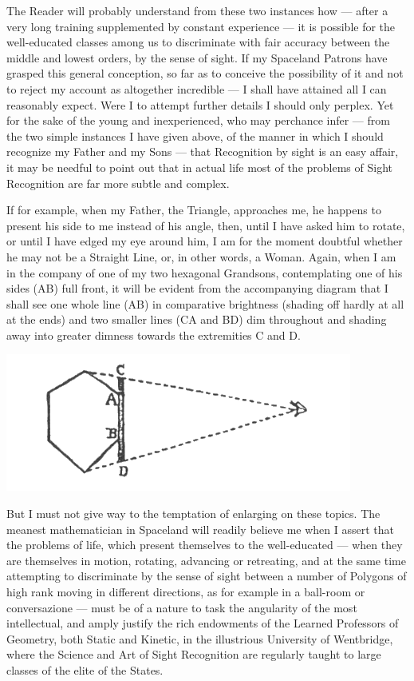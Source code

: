 \documentclass[12pt, a4paper, twoside]{memoir}
\begin{document}
The Reader will probably understand from these
two instances how --- after a very long training supplemented by constant
experience --- it is possible for the well-educated classes among us to
discriminate with fair accuracy between the middle and lowest orders, by the
sense of sight. If my Spaceland Patrons have grasped this general conception,
so far as to conceive the possibility of it and not to reject my account as
altogether incredible --- I shall have attained all I can reasonably expect.
Were I to attempt further details I should only perplex. Yet for the sake of
the young and inexperienced, who may perchance infer --- from the two simple
instances I have given above, of the manner in which I should recognize my
Father and my Sons --- that Recognition by sight is an easy affair, it may be
needful to point out that in actual life most of the problems of Sight
Recognition are far more subtle and complex.

If for example, when my Father, the Triangle, approaches me, he happens to
present his side to me instead of his angle, then, until I have asked him to
rotate, or until I have edged my eye around him, I am for the moment doubtful
whether he may not be a Straight Line, or, in other words, a Woman. Again,
when I am in the company of one of my two hexagonal Grandsons, contemplating
one of his sides (AB) full front, it will be evident from the accompanying
diagram that I shall see one whole line (AB) in comparative brightness
(shading off hardly at all at the ends) and two smaller lines (CA and BD) dim
throughout and shading away into greater dimness towards the extremities C and
D. 
\begin{center}
\includegraphics[trim=20mm 0mm 0mm 0mm, scale=0.5]{fig4}
\end{center}


But I must not give way to the temptation of enlarging on these
topics. The meanest mathematician in Spaceland will readily believe me when I
assert that the problems of life, which present themselves to the
well-educated --- when they are themselves in motion, rotating, advancing or
retreating, and at the same time attempting to discriminate by the sense of
sight between a number of Polygons of high rank moving in different
directions, as for example in a ball-room or conversazione --- must be of a
nature to task the angularity of the most intellectual, and amply justify the
rich endowments of the Learned Professors of Geometry, both Static and
Kinetic, in the illustrious University of Wentbridge, where the Science and
Art of Sight Recognition are regularly taught to large classes of the elite of
the States.
\end{document}
